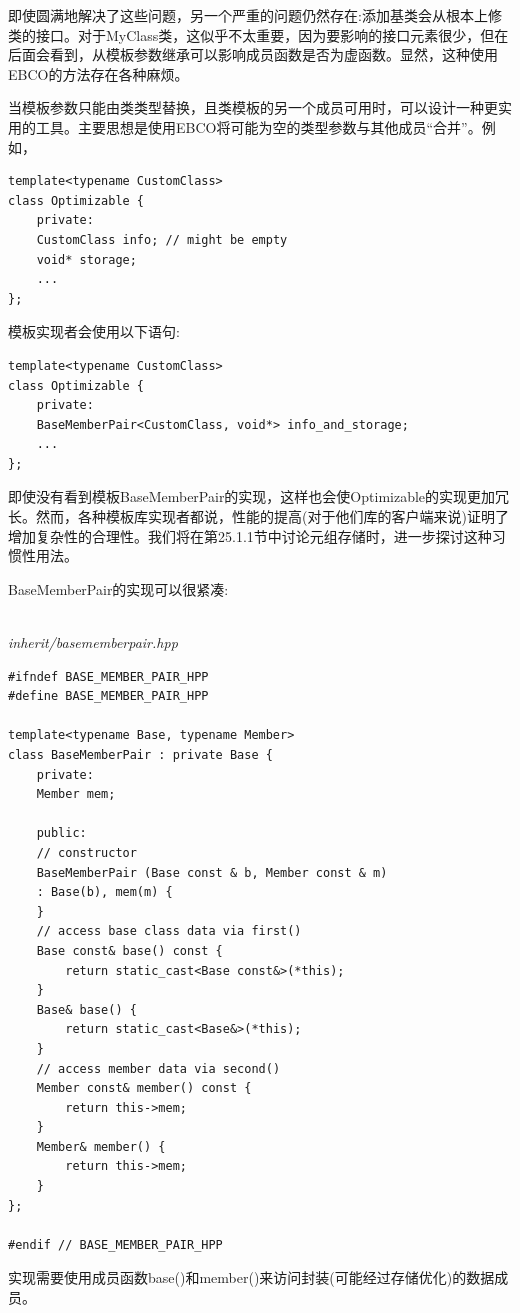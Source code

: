 即使圆满地解决了这些问题，另一个严重的问题仍然存在:添加基类会从根本上修类的接口。对于MyClass类，这似乎不太重要，因为要影响的接口元素很少，但在后面会看到，从模板参数继承可以影响成员函数是否为虚函数。显然，这种使用EBCO的方法存在各种麻烦。

当模板参数只能由类类型替换，且类模板的另一个成员可用时，可以设计一种更实用的工具。主要思想是使用EBCO将可能为空的类型参数与其他成员“合并”。例如，

\begin{lstlisting}[style=styleCXX]
template<typename CustomClass>
class Optimizable {
	private:
	CustomClass info; // might be empty
	void* storage;
	...
};
\end{lstlisting}

模板实现者会使用以下语句:

\begin{lstlisting}[style=styleCXX]
template<typename CustomClass>
class Optimizable {
	private:
	BaseMemberPair<CustomClass, void*> info_and_storage;
	...
};
\end{lstlisting}

即使没有看到模板BaseMemberPair的实现，这样也会使Optimizable的实现更加冗长。然而，各种模板库实现者都说，性能的提高(对于他们库的客户端来说)证明了增加复杂性的合理性。我们将在第25.1.1节中讨论元组存储时，进一步探讨这种习惯性用法。

BaseMemberPair的实现可以很紧凑:

\hspace*{\fill} \\ %
\noindent
\textit{inherit/basememberpair.hpp}
\begin{lstlisting}[style=styleCXX]
#ifndef BASE_MEMBER_PAIR_HPP
#define BASE_MEMBER_PAIR_HPP

template<typename Base, typename Member>
class BaseMemberPair : private Base {
	private:
	Member mem;
	
	public:
	// constructor
	BaseMemberPair (Base const & b, Member const & m)
	: Base(b), mem(m) {
	}
	// access base class data via first()
	Base const& base() const {
		return static_cast<Base const&>(*this);
	}
	Base& base() {
		return static_cast<Base&>(*this);
	}
	// access member data via second()
	Member const& member() const {
		return this->mem;
	}
	Member& member() {
		return this->mem;
	}
};

#endif // BASE_MEMBER_PAIR_HPP
\end{lstlisting}

实现需要使用成员函数base()和member()来访问封装(可能经过存储优化)的数据成员。





























